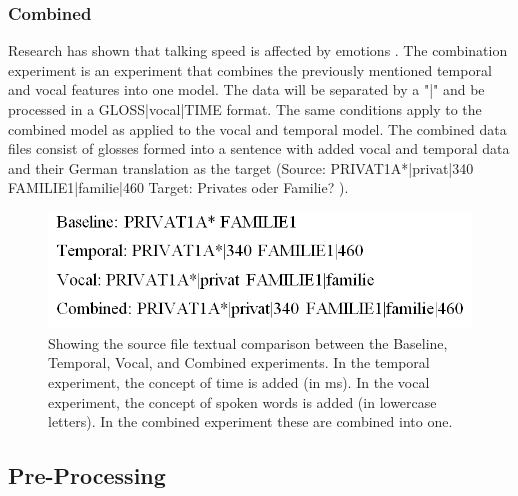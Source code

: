 \subsubsection{Combined}

Research has shown that talking speed is affected by emotions \cite{kshirsagar2002multilayer}. The combination experiment is an experiment that combines the previously mentioned temporal and vocal features into one model.  The data will be separated by a "|" and be processed in a GLOSS|vocal|TIME format. The same conditions apply to the combined model as applied to the vocal and temporal model. The combined data files consist of glosses formed into a sentence with added vocal and temporal data and their German translation as the target (Source: PRIVAT1A*|privat|340 FAMILIE1|familie|460 Target: Privates oder Familie? \cite{dgscorpus_3}).

\begin{figure}[h]
\caption{Showing the source file textual comparison between the Baseline, Temporal, Vocal, and Combined experiments. In the temporal experiment, the concept of time is added (in ms). In the vocal experiment, the concept of spoken words is added (in lowercase letters). In the combined experiment these are combined into one.}
 \centering 
 \includegraphics[width=14cm]{Bachelor CSAI thesis template/images/baseline_compared.PNG}
 
 \label{fig:baseline_comparison}
\end{figure}


\subsection{Pre-Processing}

